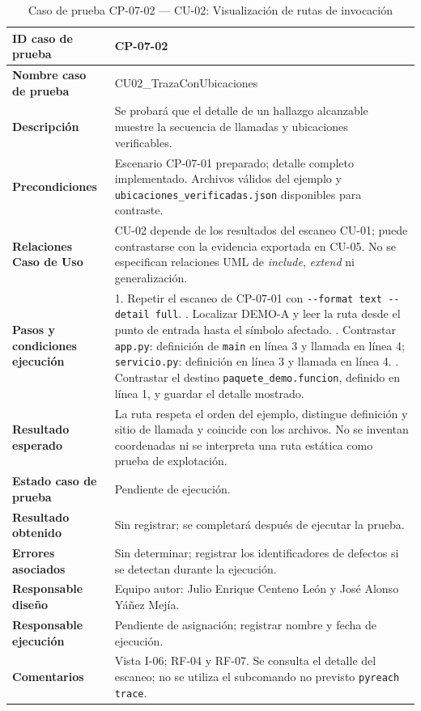\begin{table}[H]
\centering\small{}
\renewcommand{\arraystretch}{1.15}
\caption{Caso de prueba CP-07-02 --- CU-02: Visualización de rutas de invocación}
\label{p7:tab:cp07_02}
\begin{tabularx}{\textwidth}{|P{4.15cm}|Y|}
\hline
\textbf{ID caso de prueba} & CP-07-02 \\ \hline
\textbf{Nombre caso de prueba} & CU02\_\allowbreak TrazaConUbicaciones \\ \hline
\textbf{Descripción} & Se probará que el detalle de un hallazgo alcanzable muestre la secuencia de llamadas y ubicaciones verificables. \\ \hline
\textbf{Precondiciones} & Escenario CP-07-01 preparado; detalle completo implementado. Archivos válidos del ejemplo y \texttt{ubicaciones\_\allowbreak verificadas.\allowbreak json} disponibles para contraste. \\ \hline
\textbf{Relaciones Caso de Uso} & CU-02 depende de los resultados del escaneo CU-01; puede contrastarse con la evidencia exportada en CU-05. No se especifican relaciones UML de \textit{include}, \textit{extend} ni generalización. \\ \hline
\textbf{Pasos y condiciones ejecución} & 1. Repetir el escaneo de CP-07-01 con \texttt{-\allowbreak -\allowbreak format text -\allowbreak -\allowbreak detail full}. . Localizar DEMO-A y leer la ruta desde el punto de entrada hasta el símbolo afectado. . Contrastar \texttt{app.\allowbreak py}: definición de \texttt{main} en línea 3 y llamada en línea 4; \texttt{servicio.\allowbreak py}: definición en línea 3 y llamada en línea 4. . Contrastar el destino \texttt{paquete\_\allowbreak demo.\allowbreak funcion}, definido en línea 1, y guardar el detalle mostrado. \\ \hline
\textbf{Resultado esperado} & La ruta respeta el orden del ejemplo, distingue definición y sitio de llamada y coincide con los archivos. No se inventan coordenadas ni se interpreta una ruta estática como prueba de explotación. \\ \hline
\textbf{Estado caso de prueba} & Pendiente de ejecución. \\ \hline
\textbf{Resultado obtenido} & Sin registrar; se completará después de ejecutar la prueba. \\ \hline
\textbf{Errores asociados} & Sin determinar; registrar los identificadores de defectos si se detectan durante la ejecución. \\ \hline
\textbf{Responsable diseño} & Equipo autor: Julio Enrique Centeno León y José Alonso Yáñez Mejía. \\ \hline
\textbf{Responsable ejecución} & Pendiente de asignación; registrar nombre y fecha de ejecución. \\ \hline
\textbf{Comentarios} & Vista I-06; RF-04 y RF-07. Se consulta el detalle del escaneo; no se utiliza el subcomando no previsto \texttt{pyreach trace}. \\ \hline
\end{tabularx}
\end{table}
